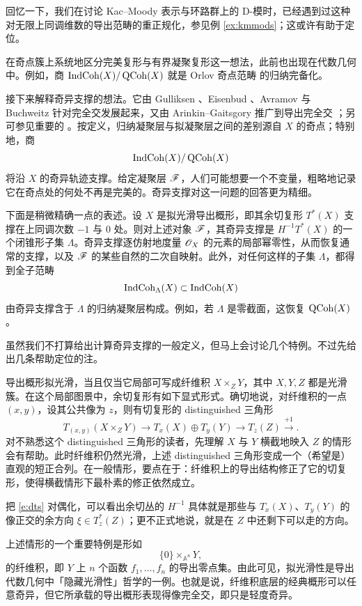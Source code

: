\begin{re} 回忆一下，我们在讨论 Kac--Moody 表示与环路群上的 D-模时，已经遇到过这种对无限上同调维数的导出范畴的重正规化，参见例 \ref{ex:kmmods}；这或许有助于定位。\end{re}

\begin{re} 在奇点簇上系统地区分完美复形与有界凝聚复形这一想法，此前也出现在代数几何中。例如，商 $\operatorname{IndCoh}(X)/\operatorname{QCoh}(X)$ 就是 Orlov 奇点范畴 \cite{orlovsingularity} 的归纳完备化。\end{re}

\ssszh 接下来解释奇异支撑的想法。它由 Gulliksen \cite{gulliksen}、Eisenbud \cite{eisenbud}、Avramov 与 Buchweitz \cite{avramovbuchweitz} 针对完全交发展起来，又由 Arinkin--Gaitsgory 推广到导出完全交 \cite{arinkingaitssingsupp}；另可参见重要的 \cite{bensoniyengarkrause}。按定义，归纳凝聚层与拟凝聚层之间的差别源自 $X$ 的奇点；特别地，商 $$\operatorname{IndCoh}(X)/\operatorname{QCoh}(X)$$ 将沿 $X$ 的奇异轨迹支撑。给定凝聚层 $\mathscr{F}$，人们可能想要一个不变量，粗略地记录它在奇点处的何处不再是完美的。奇异支撑对这一问题的回答更为精细。

下面是稍微精确一点的表述。设 $X$ 是拟光滑导出概形，即其余切复形 $T^*(X)$ 支撑在上同调次数 $-1$ 与 $0$ 处。则对上述对象 $\mathscr{F}$，其奇异支撑是 $H^{-1} T^*(X)$ 的一个闭锥形子集 $\Lambda$。奇异支撑逐仿射地度量 $\mathscr{O}_X$ 的元素的局部幂零性，从而恢复通常的支撑，以及 $\mathscr{F}$ 的某些自然的二次自映射。此外，对任何这样的子集 $\Lambda$，都得到全子范畴
\[
   \operatorname{IndCoh}_\Lambda(X) \subset \operatorname{IndCoh}(X)
\]
由奇异支撑含于 $\Lambda$ 的归纳凝聚层构成。例如，若 $\Lambda$ 是零截面，这恢复 $\operatorname{QCoh}(X)$。

虽然我们不打算给出计算奇异支撑的一般定义，但马上会讨论几个特例。不过先给出几条帮助定位的注。

\begin{re}\label{r:singsupp}导出概形拟光滑，当且仅当它局部可写成纤维积 $X \times_Z Y$，其中 $X,Y,Z$ 都是光滑簇。在这个局部图景中，余切复形有如下显式形式。确切地说，对纤维积的一点 $(x,y)$，设其公共像为 $z$，则有切复形的 distinguished 三角形
\begin{equation} \label{e:dts}
    T_{(x,y)} (X \times_Z Y) \rightarrow T_x(X) \oplus T_y(Y) \rightarrow
    T_z(Z) \xrightarrow{+1}.
\end{equation}
对不熟悉这个 distinguished 三角形的读者，先理解 $X$ 与 $Y$ 横截地映入 $Z$ 的情形会有帮助。此时纤维积仍然光滑，上述 distinguished 三角形变成一个（希望是）直观的短正合列。在一般情形，要点在于：纤维积上的导出结构修正了它的切复形，使得横截情形下最朴素的修正依然成立。

把 \eqref{e:dts} 对偶化，可以看出余切丛的 $H^{-1}$ 具体就是那些与 $T_x(X)$、$T_y(Y)$ 的像正交的余方向 $\xi \in T^*_z(Z)$；更不正式地说，就是在 $Z$ 中还剩下可以走的方向。

上述情形的一个重要特例是形如
\begin{equation}
\label{e:vanlocus} \{0\}
\times_{\mathbb{A}^n} Y,\end{equation}
的纤维积，即 $Y$ 上 $n$ 个函数 $f_1, \ldots, f_n$ 的导出零点集。由此可见，拟光滑性是导出代数几何中「隐藏光滑性」哲学的一例。也就是说，纤维积底层的经典概形可以任意奇异，但它所承载的导出概形表现得像完全交，即只是轻度奇异。

\end{re}


